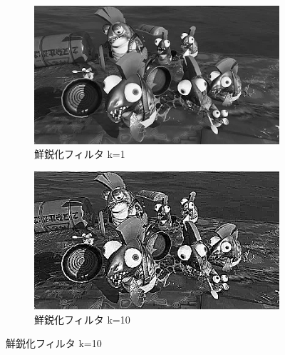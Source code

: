 \documentclass[a4paper,11pt,titlepage]{jsarticle}
\begin{document}
\begin{figure}[htbp]
  \centering

  \begin{subfigure}{0.4\textwidth}
    \includegraphics[width=\linewidth]{syake_unsharp_masked_3x3_k=1.png}
    \caption{鮮鋭化フィルタ k=1}
  \end{subfigure}
  \hfill
  \begin{subfigure}{0.4\textwidth}
    \includegraphics[width=\linewidth]{syake_unsharp_masked_3x3_k=10.png}
    \caption{鮮鋭化フィルタ k=10}
  \end{subfigure}

  \vspace{2mm}


\end{figure}
\end{document}
